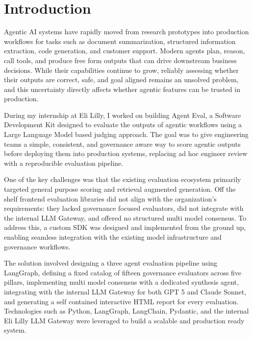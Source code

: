 \documentclass[12pt, a4paper, oneside]{report}
\begin{document}
\chapter{Introduction}

Agentic AI systems have rapidly moved from research prototypes into production workflows for tasks such as document summarization, structured information extraction, code generation, and customer support. Modern agents plan, reason, call tools, and produce free form outputs that can drive downstream business decisions. While their capabilities continue to grow, reliably assessing whether their outputs are correct, safe, and goal aligned remains an unsolved problem, and this uncertainty directly affects whether agentic features can be trusted in production.

During my internship at Eli Lilly, I worked on building Agent Eval, a Software Development Kit designed to evaluate the outputs of agentic workflows using a Large Language Model based judging approach. The goal was to give engineering teams a simple, consistent, and governance aware way to score agentic outputs before deploying them into production systems, replacing ad hoc engineer review with a reproducible evaluation pipeline.

One of the key challenges was that the existing evaluation ecosystem primarily targeted general purpose scoring and retrieval augmented generation. Off the shelf frontend evaluation libraries did not align with the organization's requirements: they lacked governance focused evaluators, did not integrate with the internal LLM Gateway, and offered no structured multi model consensus. To address this, a custom SDK was designed and implemented from the ground up, enabling seamless integration with the existing model infrastructure and governance workflows.

The solution involved designing a three agent evaluation pipeline using LangGraph, defining a fixed catalog of fifteen governance evaluators across five pillars, implementing multi model consensus with a dedicated synthesis agent, integrating with the internal LLM Gateway for both GPT 5 and Claude Sonnet, and generating a self contained interactive HTML report for every evaluation. Technologies such as Python, LangGraph, LangChain, Pydantic, and the internal Eli Lilly LLM Gateway were leveraged to build a scalable and production ready system.
\end{document}
